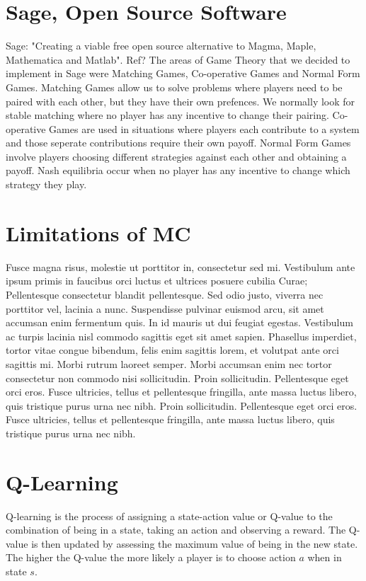 \documentclass[a1,landscape]{a0poster}
\begin{document}
\begin{multicols}{2}
\section*{Sage, Open Source Software}
Sage: "Creating a viable free open source alternative to Magma, Maple, Mathematica and Matlab".
Ref?
The areas of Game Theory that we decided to implement in Sage were Matching Games, Co-operative Games and Normal Form Games.
Matching Games allow us to solve problems where players need to be paired with each other, but they have their own prefences.
We normally look for stable matching where no player has any incentive to change their pairing.
Co-operative Games are used in situations where players each contribute to a system and those seperate contributions require their own payoff.
Normal Form Games involve players choosing different strategies against each other and obtaining a payoff.
Nash equilibria occur when no player has any incentive to change which strategy they play.



\section*{Limitations of MC}

Fusce magna risus, molestie ut porttitor in, consectetur sed mi. Vestibulum ante ipsum primis in faucibus orci luctus et ultrices posuere cubilia Curae; Pellentesque consectetur blandit pellentesque. Sed odio justo, viverra nec porttitor vel, lacinia a nunc. Suspendisse pulvinar euismod arcu, sit amet accumsan enim fermentum quis. In id mauris ut dui feugiat egestas. Vestibulum ac turpis lacinia nisl commodo sagittis eget sit amet sapien. Phasellus imperdiet, tortor vitae congue bibendum, felis enim sagittis lorem, et volutpat ante orci sagittis mi. Morbi rutrum laoreet semper. Morbi accumsan enim nec tortor consectetur non commodo nisi sollicitudin. Proin sollicitudin. Pellentesque eget orci eros. Fusce ultricies, tellus et pellentesque fringilla, ante massa luctus libero, quis tristique purus urna nec nibh. Proin sollicitudin. Pellentesque eget orci eros. Fusce ultricies, tellus et pellentesque fringilla, ante massa luctus libero, quis tristique purus urna nec nibh.


\section*{Q-Learning}
Q-learning is the process of assigning a state-action value or Q-value to the combination of being in a state, taking an action and observing a reward.
The Q-value is then updated by assessing the maximum value of being in the new state.
The higher the Q-value the more likely a player is to choose action $a$ when in state $s$.

\end{multicols}
\end{document}
